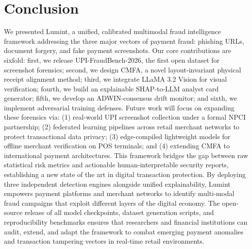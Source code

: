 \documentclass[journal]{IEEEtran}
\begin{document}
\section{Conclusion}
\label{sec:conclusion}
We presented Lumint, a unified, calibrated multimodal fraud intelligence framework addressing the three major vectors of payment fraud: phishing URLs, document forgery, and fake payment screenshots. Our core contributions are sixfold: first, we release UPI-FraudBench-2026, the first open dataset for screenshot forensics; second, we design CMFA, a novel layout-invariant physical receipt alignment method; third, we integrate LLaMA 3.2 Vision for visual verification; fourth, we build an explainable SHAP-to-LLM analyst card generator; fifth, we develop an ADWIN-consensus drift monitor; and sixth, we implement adversarial training defenses. Future work will focus on expanding these forensics via: (1) real-world UPI screenshot collection under a formal NPCI partnership; (2) federated learning pipelines across retail merchant networks to protect transactional data privacy; (3) edge-compiled lightweight models for offline merchant verification on POS terminals; and (4) extending CMFA to international payment architectures. This framework bridges the gap between raw statistical risk metrics and actionable human-interpretable security reports, establishing a new state of the art in digital transaction protection. By deploying three independent detection engines alongside unified explainability, Lumint empowers payment platforms and merchant networks to identify multi-modal fraud campaigns that exploit different layers of the digital economy. The open-source release of all model checkpoints, dataset generation scripts, and reproducibility benchmarks ensures that researchers and financial institutions can audit, extend, and adapt the framework to combat emerging payment anomalies and transaction tampering vectors in real-time retail environments.



\end{document}
